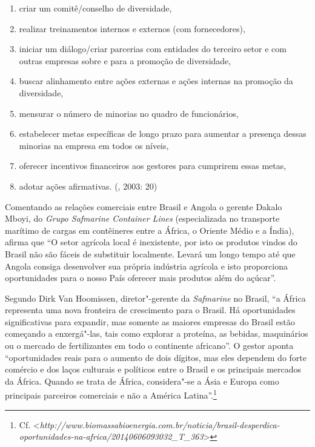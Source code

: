 \begin{enumerate}
\def\labelenumi{\alph{enumi}.}
\item criar um comitê/conselho de diversidade,

\item realizar treinamentos internos e externos (com fornecedores),

\item iniciar um diálogo/criar parcerias com entidades do terceiro setor e
com outras empresas sobre e para a promoção de diversidade,

\item buscar alinhamento entre ações externas e ações internas na promoção
da diversidade,

\item mensurar o número de minorias no quadro de funcionários,

\item estabelecer metas específicas de longo prazo para aumentar a presença
dessas minorias na empresa em todos os níveis,

\item oferecer incentivos financeiros aos gestores para cumprirem essas
metas,

\item adotar ações afirmativas. (, 2003: 20)
\end{enumerate}

Comentando as relações comerciais entre Brasil e Angola o gerente Dakalo
Mboyi, do \emph{Grupo Safmarine Container Lines} (especializada no
transporte marítimo de cargas em contêineres entre a África, o Oriente
Médio e a Índia), afirma que ``O setor agrícola local é inexistente, por
isto os produtos vindos do Brasil não são fáceis de substituir
localmente. Levará um longo tempo até que Angola consiga desenvolver sua
própria indústria agrícola e isto proporciona oportunidades para o nosso
País oferecer mais produtos além do açúcar''.

Segundo Dirk Van Hoomissen, diretor"-gerente da \emph{Safmarine} no
Brasil, ``a África representa uma nova fronteira de crescimento para o
Brasil. Há oportunidades significativas para expandir, mas somente as
maiores empresas do Brasil estão começando a enxergá"-las, tais como
explorar a proteína, as bebidas, maquinários ou o mercado de
fertilizantes em todo o continente africano''. O gestor aponta
``oportunidades reais para o aumento de dois dígitos, mas eles dependem
do forte comércio e dos laços culturais e políticos entre o Brasil e os
principais mercados da África. Quando se trata de África, considera"-se a
Ásia e Europa como principais parceiros comerciais e não a América
Latina''.\footnote{Cf.
  \textless{}\emph{http://www.biomassabioenergia.com.br/noticia/brasil-desperdica-oportunidades-na-africa/20140606093032\_T\_363}\textgreater{}}

